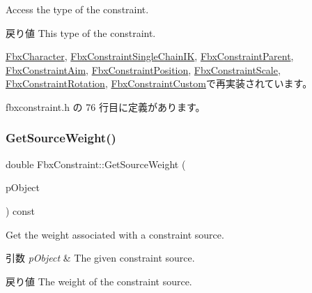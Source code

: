 Access the type of the constraint. \begin{DoxyReturn}{戻り値}
This type of the constraint. 
\end{DoxyReturn}


\hyperlink{class_fbx_character_ab6c9f1540880fa72c17a27d19ff11425}{Fbx\+Character}, \hyperlink{class_fbx_constraint_single_chain_i_k_adc9d38f5ae55bf9c6415334a81cbdffb}{Fbx\+Constraint\+Single\+Chain\+IK}, \hyperlink{class_fbx_constraint_parent_a02f6bd2dda6447a23d81d82ce06b73f0}{Fbx\+Constraint\+Parent}, \hyperlink{class_fbx_constraint_aim_a061ee3079d1182fa2e1a5eeebff01b15}{Fbx\+Constraint\+Aim}, \hyperlink{class_fbx_constraint_position_a79f710b1fec4b1285b53dec13ea68824}{Fbx\+Constraint\+Position}, \hyperlink{class_fbx_constraint_scale_a7eb92c352d4a4bd3c0754dd4e53fa6e4}{Fbx\+Constraint\+Scale}, \hyperlink{class_fbx_constraint_rotation_a8d9f54ac347d18a0871eafc21e88cb77}{Fbx\+Constraint\+Rotation}, \hyperlink{class_fbx_constraint_custom_a80bc6e130ef40b27e4621e1a54b22eb8}{Fbx\+Constraint\+Custom}で再実装されています。



 fbxconstraint.\+h の 76 行目に定義があります。

\mbox{\label{class_fbx_constraint_a4466dd54c32b822252c5e960d0be1836}} 
\subsubsection{\texorpdfstring{Get\+Source\+Weight()}{GetSourceWeight()}}
{\footnotesize\ttfamily double Fbx\+Constraint\+::\+Get\+Source\+Weight (\begin{DoxyParamCaption}\item[{const \hyperlink{class_fbx_object}{Fbx\+Object} $\ast$}]{p\+Object }\end{DoxyParamCaption}) const}

Get the weight associated with a constraint source. 
\begin{DoxyParams}{引数}
{\em p\+Object} & The given constraint source. \\
\hline
\end{DoxyParams}
\begin{DoxyReturn}{戻り値}
The weight of the constraint source. 
\end{DoxyReturn}


